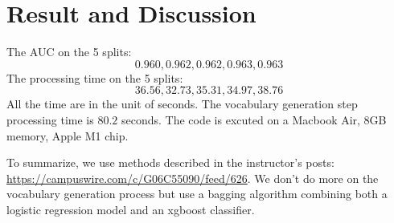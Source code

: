 \documentclass[12pt]{article}
\theoremstyle{plain}
\begin{document}
\section{Result and Discussion}
The AUC on the 5 splits: 
\begin{equation}
0.960, 0.962, 0.962, 0.963, 0.963
\end{equation}
The processing time on the 5 splits:
\begin{equation}
36.56, 32.73, 35.31, 34.97, 38.76
\end{equation}
All the time are in the unit of seconds. The vocabulary generation step processing time is $80.2$ seconds. The code is excuted on a Macbook Air, 8GB memory, Apple M1 chip.

To summarize, we use methods described in the instructor's posts: \url{https://campuswire.com/c/G06C55090/feed/626}. We don't do more on the vocabulary generation process but use a bagging algorithm combining both a logistic regression model  and an xgboost classifier.
\end{document}
